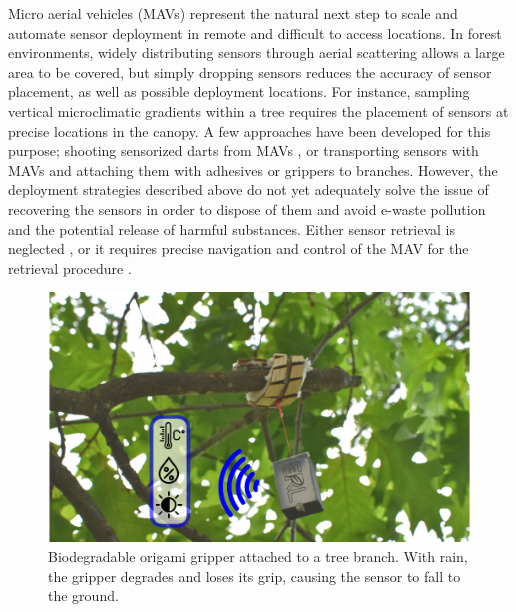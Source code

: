 Micro aerial vehicles (MAVs) represent the natural next step to scale and automate sensor deployment in remote and difficult to access locations.
In forest environments, widely distributing sensors through aerial scattering \cite{Pounds2015, Iyer2022} allows a large area to be covered, but simply dropping sensors reduces the accuracy of sensor placement, as well as possible deployment locations. For instance, sampling vertical microclimatic gradients within a tree requires the placement of sensors at precise locations in the canopy. A few approaches have been developed for this purpose; shooting sensorized darts from MAVs \cite{Farinha2020}, or transporting sensors with MAVs and attaching them with adhesives \cite{Hamaza2019} or grippers \cite{Geckeler2022a} to branches. However, the deployment strategies described above do not yet adequately solve the issue of recovering the sensors in order to dispose of them and avoid e-waste pollution and the potential release of harmful substances. Either sensor retrieval is neglected \cite{Pounds2015,Farinha2020}, or it requires precise navigation and control of the MAV for the retrieval procedure \cite{Hamaza2019, Geckeler2022a}.

\begin{figure}[!t]
\centering
\includegraphics[width=1\columnwidth]{figures/figure1-overview/figure1-overview.pdf}
\caption{Biodegradable origami gripper attached to a tree branch. With rain, the gripper degrades and loses its grip, causing the sensor to fall to the ground.}
\label{fig1_overview_intro}
\end{figure}


